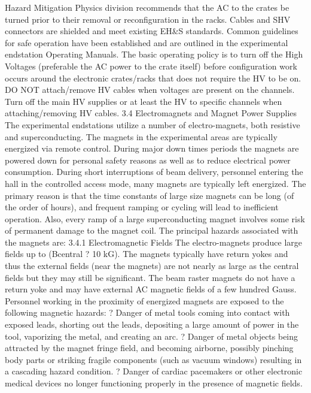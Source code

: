 {{{Hazard Mitigation
	Physics division recommends that the AC to the crates be turned prior to their removal or reconfiguration in the racks. Cables and SHV connectors are shielded and meet existing EH\&S standards. Common guidelines for safe operation have been established and are outlined in the experimental endstation Operating Manuals. The basic operating policy is to turn off the High Voltages (preferable the AC power to the crate itself) before configuration work occurs around the electronic crates/racks that does not require the HV to be on. DO NOT attach/remove HV cables when voltages are present on the channels. Turn off the main HV supplies or at least the HV to specific channels when attaching/removing HV cables.
3.4 		Electromagnets and Magnet Power Supplies
	The experimental endstations utilize a number of electro-magnets, both resistive and superconducting. The magnets in the experimental areas are typically energized via remote control. During major down times periods the magnets are powered down for personal safety reasons as well as to reduce electrical power consumption. During short interruptions of beam delivery, personnel entering the hall in the controlled access mode, many magnets are typically left energized. The primary reason is that the time constants of large size magnets can be long (of the order of hours), and frequent ramping or cycling will lead to inefficient operation. Also, every ramp of a large superconducting magnet involves some risk of permanent damage to the magnet coil. The principal hazards associated with the magnets are:
3.4.1		Electromagnetic Fields
	The electro-magnets produce large fields up to (Bcentral ? 10 kG). The magnets typically have return yokes and thus the external fields (near the magnets) are not nearly as large as the central fields but they may still be significant. The beam raster magnets do not have a return yoke and may have external AC magnetic fields of a few hundred Gauss. Personnel working in the proximity of energized magnets are exposed to the following magnetic hazards:
	? 	Danger of metal tools coming into contact with exposed leads, shorting out the
 			leads, depositing a large amount of power in the tool, vaporizing the metal, and
 			creating an arc.
	? 	Danger of metal objects being attracted by the magnet fringe field, and 
			becoming airborne, possibly pinching body parts or striking fragile components
 			(such as vacuum windows) resulting in a cascading hazard condition.
	? 	Danger of cardiac pacemakers or other electronic medical devices no longer 
			functioning properly in the presence of magnetic fields.
}}}
